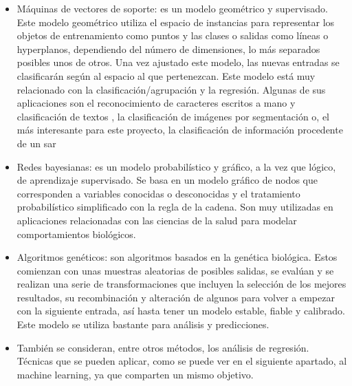 \begin{itemize}
	\item Máquinas de vectores de soporte: es un modelo geométrico y supervisado. Este modelo geométrico utiliza el espacio de instancias para representar los objetos de entrenamiento como puntos y las clases o salidas como líneas o hyperplanos, dependiendo del número de dimensiones, lo más separados posibles unos de otros. Una vez ajustado este modelo, las nuevas entradas se clasificarán según al espacio al que pertenezcan. Este modelo está muy relacionado con la clasificación/agrupación y la regresión. Algunas de sus aplicaciones son el reconocimiento de caracteres escritos a mano \cite{MLhand} y clasificación de textos \citep{MLText}, la clasificación de imágenes por segmentación \citep{MLimg} o, el más interesante para este proyecto, la clasificación de información procedente de un \gls{sar} \citep{MLSAR}
	\item Redes bayesianas: es un modelo probabilístico y gráfico, a la vez que lógico, de aprendizaje supervisado. Se basa en un modelo gráfico de nodos que corresponden a variables conocidas o desconocidas y el tratamiento probabilístico simplificado con la regla de la cadena. Son muy utilizadas en aplicaciones relacionadas con las ciencias de la salud para modelar comportamientos biológicos. 
	\item Algoritmos genéticos: son algoritmos basados en la genética biológica. Estos comienzan con unas muestras aleatorias de posibles salidas, se evalúan y se realizan una serie de transformaciones que incluyen la selección de los mejores resultados, su recombinación y alteración de algunos para volver a empezar con la siguiente entrada, así hasta tener un modelo estable, fiable y calibrado. Este modelo se utiliza bastante para análisis y predicciones.
	\item También se consideran, entre otros métodos, los análisis de regresión. Técnicas que se pueden aplicar, como se puede ver en el siguiente apartado, al machine learning, ya que comparten un mismo objetivo. 
\end{itemize}
